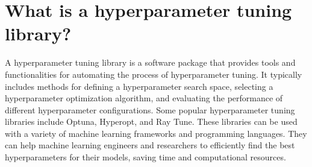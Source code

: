 \section{What is a hyperparameter tuning library?}
A hyperparameter tuning library is a software package that provides tools and functionalities for automating the process of hyperparameter tuning. It typically includes methods for defining a hyperparameter search space, selecting a hyperparameter optimization algorithm, and evaluating the performance of different hyperparameter configurations. Some popular hyperparameter tuning libraries include Optuna, Hyperopt, and Ray Tune. These libraries can be used with a variety of machine learning frameworks and programming languages. They can help machine learning engineers and researchers to efficiently find the best hyperparameters for their models, saving time and computational resources.

